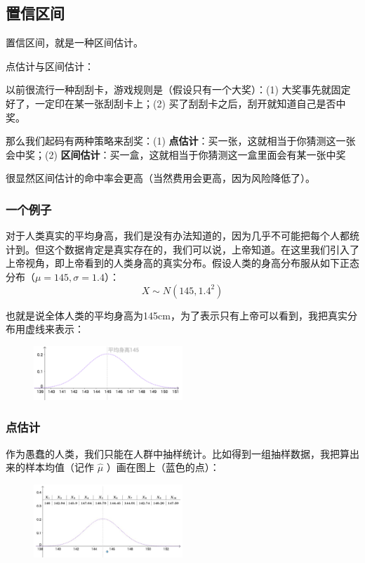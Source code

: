 \documentclass[12pt]{article}
\begin{document}
\subsection{置信区间}
置信区间，就是一种区间估计。

\begin{framed}
点估计与区间估计：

以前很流行一种刮刮卡，游戏规则是（假设只有一个大奖）：(1) 大奖事先就固定好了，一定印在某一张刮刮卡上；(2) 买了刮刮卡之后，刮开就知道自己是否中奖。

那么我们起码有两种策略来刮奖：(1) \textbf{点估计}：买一张，这就相当于你猜测这一张会中奖；(2) \textbf{区间估计}：买一盒，这就相当于你猜测这一盒里面会有某一张中奖

很显然区间估计的命中率会更高（当然费用会更高，因为风险降低了）。
\end{framed}

\subsubsection{一个例子}
对于人类真实的平均身高，我们是没有办法知道的，因为几乎不可能把每个人都统计到。但这个数据肯定是真实存在的，我们可以说，上帝知道。在这里我们引入了上帝视角，即上帝看到的人类身高的真实分布。假设人类的身高分布服从如下正态分布（$\mu = 145, \sigma = 1.4$）：
$$
X \sim N(145, 1.4^2)
$$

也就是说全体人类的平均身高为145cm，为了表示只有上帝可以看到，我把真实分布用虚线来表示：
\begin{figure}[H]
    \centering
    \includegraphics[width=0.5\textwidth]{fig/Confidence_Interval_Example_1.png}
\end{figure}

\subsubsection{点估计}
作为愚蠢的人类，我们只能在人群中抽样统计。比如得到一组抽样数据，我把算出来的样本均值（记作 $\hat{\mu}$ ）画在图上（蓝色的点）：
\begin{figure}[H]
    \centering
    \includegraphics[width=0.5\textwidth]{fig/Confidence_Interval_Example_2.png}
\end{figure}
\end{document}
